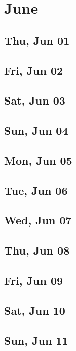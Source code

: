\chapter{June}
	\section{Thu, Jun 01}
		
	\section{Fri, Jun 02}
		
	\section{Sat, Jun 03}
		
	\section{Sun, Jun 04}
		
	\section{Mon, Jun 05}
		
	\section{Tue, Jun 06}
		
	\section{Wed, Jun 07}
		
	\section{Thu, Jun 08}
		
	\section{Fri, Jun 09}
		
	\section{Sat, Jun 10}
		
	\section{Sun, Jun 11}
		
